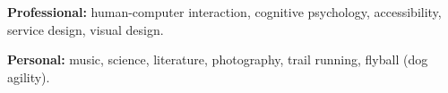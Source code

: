 \documentclass[]{friggeri-cv} %
\begin{document}
\textbf{Professional:} human-computer interaction, cognitive psychology, accessibility, service design, visual design.

\textbf{Personal:} music, science, literature, photography, trail running, flyball (dog agility).




\end{document}

